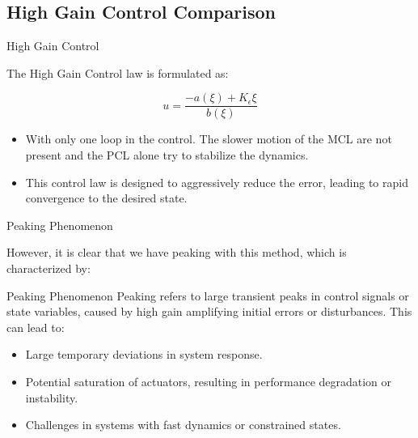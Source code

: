 
\subsection{High Gain Control Comparison}
\begin{frame}{High Gain Control}

The High Gain Control law is formulated as:

\begin{equation}
u = \frac{-a(\xi) + K_\epsilon \xi }{b(\xi)}
\end{equation}

\begin{itemize}
    \item With only one loop in the control. The slower motion of the MCL are not present and the PCL alone try to stabilize the dynamics.

    \item This control law is designed to aggressively reduce the error, leading to rapid convergence to the desired state.
\end{itemize}

\end{frame}


\begin{frame}{Peaking Phenomenon}
    
However, it is clear that we have peaking with this method, which is characterized by:

\begin{block}{Peaking Phenomenon}
Peaking refers to large transient peaks in control signals or state variables, caused by high gain amplifying initial errors or disturbances. This can lead to:
\begin{itemize}
    \item Large temporary deviations in system response.
    \item Potential saturation of actuators, resulting in performance degradation or instability.
    \item Challenges in systems with fast dynamics or constrained states.
\end{itemize}
\end{block}

\end{frame}



